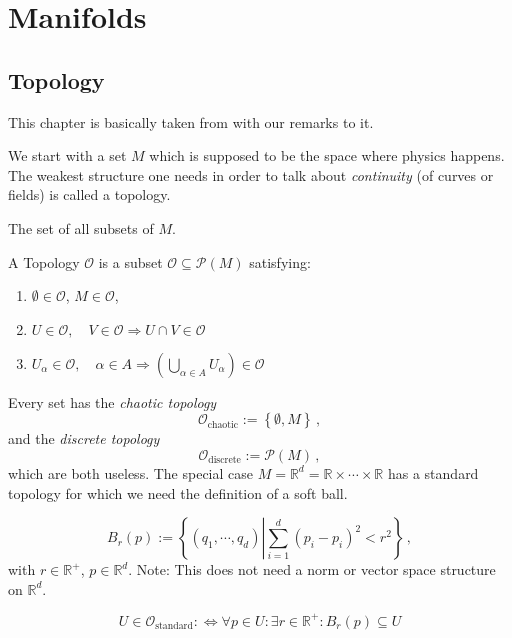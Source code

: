\section{Manifolds}
\subsection{Topology}
This chapter is basically taken from \citep{Schuller15} with our remarks to it.

We start with a set $M$ which is supposed to be the space where physics happens.
The weakest structure one needs in order to talk about \textit{continuity} (of curves or fields)
is called a topology.

\begin{defn}
    The set of all subsets of $M$.
\end{defn}

\begin{defn}[Topology]
    A Topology $\mathcal{O}$ is a subset $\mathcal{O} \subseteq \mathcal{P}(M)$ satisfying:
    \begin{enumerate}
        \item $\emptyset \in \mathcal{O}$, $M\in\mathcal{O}$,
        \item $U\in\mathcal{O},\quad V\in\mathcal{O}\Rightarrow U\cap V\in\mathcal{O}$
        \item $U_\alpha\in\mathcal{O},\quad \alpha\in A \Rightarrow
            \left( \bigcup\limits_{\alpha\in A} U_\alpha \right) \in \mathcal{O}$
    \end{enumerate}
\end{defn}

Every set has the \textit{chaotic topology}
\begin{equation}
    \mathcal{O}_\text{chaotic} := \left\{ \emptyset, M \right\}\,,
\end{equation}
and the \textit{discrete topology}
\begin{equation}
    \mathcal{O}_\text{discrete} := \mathcal{P}(M)\,,
\end{equation}
which are both useless.
The special case $M = \mathbb{R}^d = \mathbb{R} \times \cdots \times \mathbb{R}$ has a standard topology
for which we need the definition of a soft ball.
\begin{defn}
   \begin{equation}
   B_r(p) := \left\{ (q_1,\cdots,q_d) \left| \sum_{i=1}^{d}(p_i-p_i)^2 < r^2\right. \right\}\,,
   \end{equation} 
   with $r\in \mathbb{R}^+$, $p\in\mathbb{R}^d$.
   Note: This does not need a norm or vector space structure on $\mathbb{R}^d$.
\end{defn}
\begin{defn}
    \begin{equation}
        U \in \mathcal{O}_\text{standard} :\Leftrightarrow \forall p\in U:
        \exists r\in\mathbb{R}^+ : B_r(p) \subseteq U
    \end{equation}
\end{defn}

